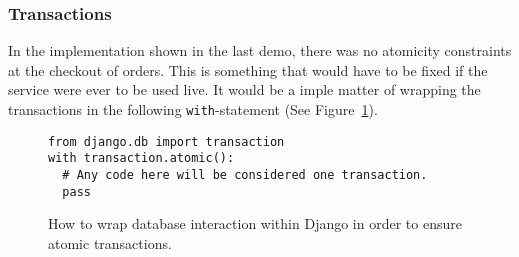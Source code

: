 \subsubsection{Transactions}\label{sec:transaction}

In the implementation shown in the last demo, there was no atomicity
constraints at the checkout of orders. This is something that would have to be
fixed if the service were ever to be used live. It would be a imple matter of
wrapping the transactions in the following \texttt{with}-statement
(See Figure~\ref{fig:transaction}).

\begin{figure}[H]
\centering
\begin{verbatim}
from django.db import transaction
with transaction.atomic():
  # Any code here will be considered one transaction.
  pass
\end{verbatim}
\caption{\label{fig:transaction} How to wrap database interaction within
Django in order to ensure atomic transactions.}
\end{figure}
